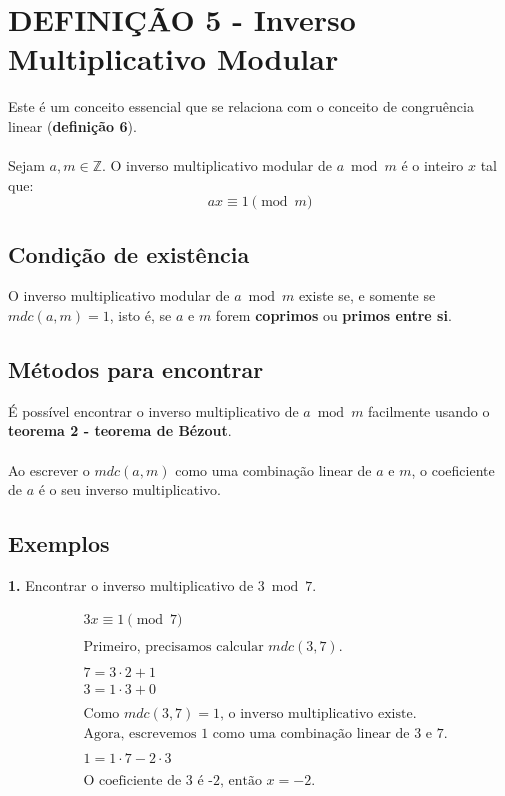 \section*{DEFINIÇÃO 5 - Inverso Multiplicativo Modular}
Este é um conceito essencial que se relaciona com o conceito de congruência linear (\textbf{definição 6}).\\\\
Sejam $a,m \in \mathbb{Z}$. O inverso multiplicativo modular de $a \bmod m$ é o inteiro $x$ tal que:
\[
    ax \equiv 1 \pmod m
\]

\subsection*{Condição de existência}
O inverso multiplicativo modular de $a \bmod m$ existe se, e somente se $mdc(a,m) = 1$, isto é, se $a$ e $m$ forem \textbf{coprimos} ou \textbf{primos entre si}.\\

\subsection*{Métodos para encontrar}
É possível encontrar o inverso multiplicativo de $a \bmod m$ facilmente usando o \textbf{teorema 2 - teorema de Bézout}.
\\\\Ao escrever o $mdc(a,m)$ como uma combinação linear de $a$ e $m$, o coeficiente de $a$ é o seu inverso multiplicativo.

\subsection*{Exemplos}
\textbf{1.} Encontrar o inverso multiplicativo de $3 \bmod 7$.

\begin{align*}
     & 3x \equiv 1 \pmod 7                                             \\
    \\
     & \text{Primeiro, precisamos calcular $mdc(3,7)$.}                \\
    \\
     & 7 = 3 \cdot 2 + 1                                               \\
     & 3 = 1 \cdot 3 + 0                                               \\
    \\
     & \text{Como $mdc(3,7) = 1$, o inverso multiplicativo existe.}    \\
     & \text{Agora, escrevemos 1 como uma combinação linear de 3 e 7.} \\
    \\
     & 1 = 1 \cdot 7 - 2 \cdot 3                                       \\
    \\
     & \text{O coeficiente de 3 é -2, então $x = -2$.}
\end{align*}

